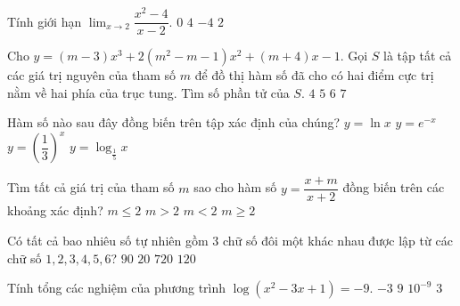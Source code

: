 \begin{ex}%
Tính giới hạn $\displaystyle \lim_{x \to 2} \dfrac{x^2-4}{x-2}.$
\choice
{$0$}
{\True $4$}
{$-4$}
{$2$}
\end{ex}

\begin{ex}%
Cho $y=(m-3)x^3+2(m^2-m-1)x^2+(m+4)x-1$. Gọi $S$ là tập tất cả các giá trị nguyên của tham số $m$ để đồ thị hàm số đã cho có hai điểm cực trị nằm về hai phía của trục tung. Tìm số phần tử của $S$.
\choice
{$4$}
{$5$}
{\True $6$}
{$7$}
\end{ex}

\begin{ex}%
Hàm số nào sau đây đồng biến trên tập xác định của chúng?
\choice
{\True $y=\ln x$}
{$y=e^{-x}$}
{$y=\left (\dfrac{1}{3}\right )^x$}
{$y=\log_{\frac{1}{5}}x$}
\end{ex}

\begin{ex}%
Tìm tất cả giá trị của tham số $m$ sao cho hàm số $y=\dfrac{x+m}{x+2}$ đồng biến trên các khoảng xác định?
\choice
{$m \leq 2$}
{$m>2$}
{\True $m<2$}
{$m \geq 2$}
\end{ex}

\begin{ex}%
Có tất cả bao nhiêu số tự nhiên gồm $3$ chữ số đôi một  khác nhau được lập từ các chữ số $1,2,3,4,5,6$?
\choice
{$90$}
{$20$}
{$720$}
{\True $120$}
\end{ex}

\begin{ex}%
Tính tổng các nghiệm của phương trình $\log (x^2-3x+1) =-9$. 
\choice
{$-3$}
{$9$}
{$10^{-9}$}
{\True $3$}
\end{ex}

